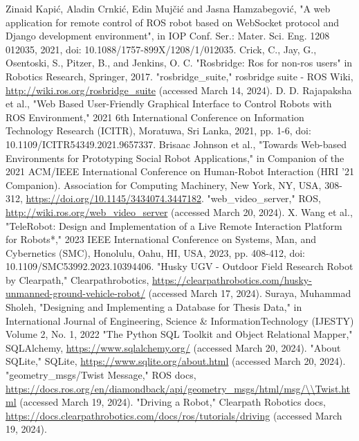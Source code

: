 \documentclass[conference]{IEEEtran}
\begin{document}
\begin{thebibliography}{00}
 Zinaid Kapić, Aladin Crnkić, Edin Mujčić and Jasna Hamzabegović, "A web application for remote control of ROS robot based on WebSocket protocol and Django development environment", in IOP Conf. Ser.: Mater. Sci. Eng. 1208 012035, 2021, doi: 10.1088/1757-899X/1208/1/012035.
 Crick, C., Jay, G., Osentoski, S., Pitzer, B., and Jenkins, O. C. "Rosbridge: Ros for non-ros users" in Robotics Research, Springer, 2017.
"rosbridge\_suite," rosbridge suite - ROS Wiki, \url{http://wiki.ros.org/rosbridge\_suite} (accessed March 14, 2024).
 D. D. Rajapaksha et al., "Web Based User-Friendly Graphical Interface to Control Robots with ROS Environment," 2021 6th International Conference on Information Technology Research (ICITR), Moratuwa, Sri Lanka, 2021, pp. 1-6, doi: 10.1109/ICITR54349.2021.9657337.
Brisaac Johnson et al., "Towards Web-based Environments for Prototyping Social Robot Applications," in Companion of the 2021 ACM/IEEE International Conference on Human-Robot Interaction (HRI '21 Companion). Association for Computing Machinery, New York, NY, USA, 308-312, \url{https://doi.org/10.1145/3434074.3447182}.
"web\_video\_server," ROS, \url{http://wiki.ros.org/web\_video\_server} (accessed March 20, 2024).
X. Wang et al., "TeleRobot: Design and Implementation of a Live Remote Interaction Platform for Robots*," 2023 IEEE International Conference on Systems, Man, and Cybernetics (SMC), Honolulu, Oahu, HI, USA, 2023, pp. 408-412, doi: 10.1109/SMC53992.2023.10394406.
"Husky UGV - Outdoor Field Research Robot by Clearpath," Clearpathrobotics, \url{https://clearpathrobotics.com/husky-unmanned-ground-vehicle-robot/} (accessed March 17, 2024).
 Suraya, Muhammad Sholeh, "Designing and Implementing a Database for Thesis Data," in International Journal of Engineering, Science \& InformationTechnology (IJESTY) Volume 2, No. 1, 2022
"The Python SQL Toolkit and Object Relational Mapper," SQLAlchemy, \url{https://www.sqlalchemy.org/} (accessed March 20, 2024).
"About SQLite," SQLite, \url{https://www.sqlite.org/about.html} (accessed March 20, 2024).
"geometry\_msgs/Twist Message," ROS docs, \url{https://docs.ros.org/en/diamondback/api/geometry\_msgs/html/msg/\\Twist.html} (accessed March 19, 2024).
"Driving a Robot," Clearpath Robotics docs, \url{https://docs.clearpathrobotics.com/docs/ros/tutorials/driving} (accessed March 19, 2024).

\end{thebibliography}
\end{document}

